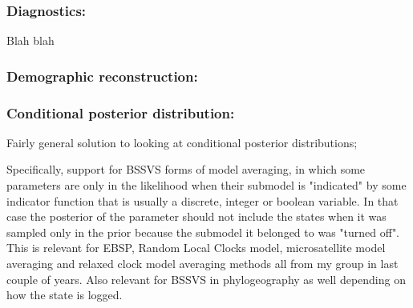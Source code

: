 \documentclass{bioinfo}
\begin{document}


\subsubsection*{Diagnostics:} Blah blah 

\subsubsection*{Demographic reconstruction:} 



\subsubsection*{Conditional posterior distribution:}

Fairly general solution to looking at conditional posterior distributions;

Specifically, support for BSSVS forms of model averaging, in which some parameters are only in the likelihood when their submodel is "indicated" by some indicator function that is usually a discrete, integer or boolean variable. In that case the posterior of the parameter should not include the states when it was sampled only in the prior because the submodel it belonged to was "turned off". This is relevant for EBSP, Random Local Clocks model, microsatellite model averaging and relaxed clock model averaging methods all from my group in last couple of years. Also relevant for BSSVS in phylogeography as well depending on how the state is logged.
\end{document}
